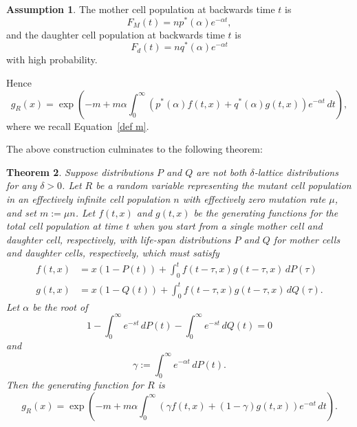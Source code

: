 \documentclass[12pt]{amsart}
\theoremstyle{plain}
\newtheorem{thm}{Theorem}[section]
\theoremstyle{definition}
\theoremstyle{remark}
\theoremstyle{definition}
\newtheorem{assume}[thm]{Assumption}
\begin{document}
\begin{assume} The mother cell population at backwards time $t$ is
\begin{equation}
F_M(t) = n p^*(\alpha) e^{-\alpha t},
\end{equation}
and the daughter cell population at backwards time $t$ is
\begin{equation}
F_d(t) = n q^*(\alpha) e^{-\alpha t}
\end{equation}
with high probability.
\end{assume}

Hence
\begin{equation}
g_R(x) = \exp \left(-m + m \alpha \int_0^\infty ( p^*(\alpha) f(t,x) + q^*(\alpha)g(t,x)) e^{-\alpha t} \, dt \right),
\end{equation}
where we recall Equation~\eqref{def m}.

The above construction culminates to the following theorem:

\begin{thm} \label{multiMutantDist}
Suppose distributions $P$ and $Q$ are not both $\delta$-lattice distributions for any $\delta>0$.  Let $R$ be a random variable representing the mutant cell population in an effectively infinite cell population $n$ with effectively zero mutation rate $\mu$, and set $m := \mu n$. Let $f(t,x)$ and $g(t,x)$ be the generating functions for the total cell population at time $t$ when you start from a single mother cell and daughter cell, respectively, with life-span distributions $P$ and $Q$ for mother cells and daughter cells, respectively, which must satisfy
\begin{equation}
\begin{aligned}
f(t,x) &= x(1-P(t)) + \int_0^t f(t-\tau,x)g(t-\tau,x) \, dP(\tau) \\
g(t,x) &= x(1-Q(t)) + \int_0^t f(t-\tau,x)g(t-\tau,x) \, dQ(\tau) .
\end{aligned}
\end{equation}
Let $\alpha$ be the root of
\begin{equation}
1- \int_0^\infty e^{-st} \, dP(t) - \int_0^\infty e^{-st} \, dQ(t) = 0
\end{equation}
and
\begin{equation}
\gamma := \int_0^\infty e^{-\alpha t} \, dP(t).
\end{equation}
Then the generating function for $R$ is
\begin{equation}
g_R(x) = \exp \left(-m + m \alpha \int_0^\infty ( \gamma f(t,x) + (1-\gamma)g(t,x)) e^{-\alpha t} \, dt \right). \label{gr2multi}
\end{equation}
\end{thm}
\end{document}
